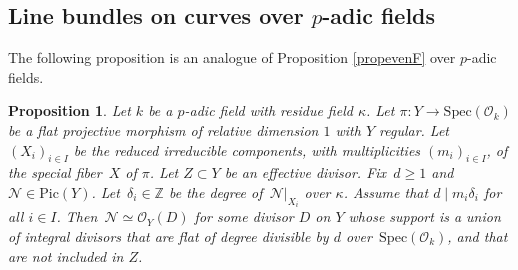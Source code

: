 \documentclass{amsart}
\newtheorem{prop}[thm]{Proposition}
\theoremstyle{definition}
\theoremstyle{remark}
\numberwithin{equation}{section}
\newcommand{\Spec}{\mathrm{Spec}}
\newcommand{\Pic}{\mathrm{Pic}}
\def\Z{\mathbb Z}
\def\cN{\mathcal{N}}
\def\cO{\mathcal{O}}
\begin{document}
\subsection{Line bundles on curves over \texorpdfstring{$p$}{p}-adic fields}
\label{pareven}

The following proposition is an analogue of Proposition \ref{propevenF} over $p$-adic fields.

\begin{prop}
\label{propeven}
Let $k$ be a $p$-adic field with residue field $\kappa$. Let $\pi:Y\to \Spec(\cO_k)$ be a flat projective morphism of relative dimension $1$ with $Y$ regular. 
Let $(X_i)_{i\in I}$ be the reduced irreducible components, with multiplicities $(m_i)_{i\in I}$, of the special fiber~$X$ of $\pi$.
Let $Z\subset Y$ be an effective divisor. Fix~$d\geq 1$ and~$\cN\in\Pic(Y)$. Let~$\delta_i\in \Z$ be the degree of~$\cN|_{X_i}$ over $\kappa$. Assume that $d\mid m_i\delta_i$ for all $i\in I$.
Then~$\cN\simeq\cO_Y(D)$ for some divisor $D$ on $Y$ whose support is a union of integral divisors that are flat of degree divisible by $d$ over~$\Spec(\cO_k)$, and that are not included in $Z$.
\end{prop}
\end{document}
